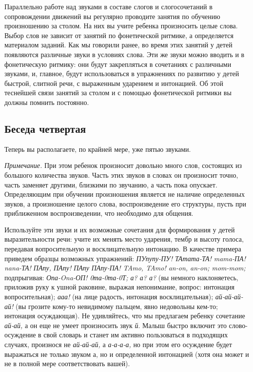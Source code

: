\documentclass[a5paper]{book}
\renewcommand{\emph}[1]{\textit{#1}}
\begin{document}
Параллельно работе над звуками в составе слогов и слогосочетаний в
сопровождении движений вы регулярно проводите занятия по обучению
произношению за столом. На них вы учите ребенка произносить целые слова.
Выбор слов не зависит от занятий по фонетической ритмике, а определяется
материалом заданий. Как мы говорили ранее, во время этих занятий у детей
появляются различные звуки в условиях слова. Эти же звуки можно вводить
и в фонетическую ритмику: они будут закрепляться в сочетаниях с
различными звуками, и, главное, будут использоваться в упражнениях по
развитию у детей быстрой, слитной речи, с выраженным ударением и
интонацией. Об этой теснейшей связи занятий за столом и с помощью
фонетической ритмики вы должны помнить постоянно.

\subsection*{Беседа четвертая}

Теперь вы располагаете, по крайней мере, уже пятью звуками.

\emph{Примечание.} При этом ребенок произносит довольно много слов,
состоящих из большого количества звуков. Часть этих звуков в словах он
произносит точно, часть заменяет другими, близкими по звучанию, а часть
пока опускает. Определяющим при обучении произношения является не
наличие определенных звуков, а произношение целого слова,
воспроизведение его структуры, пусть при приближенном воспроизведении,
что необходимо для общения.

Используйте эти звуки и их возможные сочетания для формирования у детей
выразительности речи: учите их менять место ударения, тембр и высоту
голоса, передавая вопросительную и восклицательную интонацию. В качестве
примера приведем образцы возможных упражнений: \emph{ПУпупу-ПУ!
ТАтата-ТА! mama-ПА! nana-ТА! ПАпу, ПАпу! ПАпу} \emph{ПАпу-ПА! TAmo,
TAmo! an-on, an-on; mom-mom;} подпрыгивая: \emph{Опа-Ona-ОП! 0та-0та-0Т;
а? а? а?} (вы немного наклоняетесь, приложив руку к ушной раковине,
выражая непонимание, вопрос: интонация вопросительная); \emph{ааа!} (на
лице радость, интонация восклицательная); \emph{ай-ай-ай-ай!} (вы
грозите кому-то невидимому пальцем, явно недовольны кем-то; интонация
осуждающая). Не удивляйтесь, что мы предлагаем ребенку сочетание
\emph{ай-ай,} а он еще не умеет произносить звук \emph{й}. Малыш быстро
включит это слово-осуждение в свой словарь и станет им активно
пользоваться в подходящих случаях, произнося не \emph{ай-ай-ай,} а
\emph{а-а-а-а,} но при этом его осуждение будет выражаться не только
звуком а, но и определенной интонацией (хотя она может и не в полной
мере соответствовать вашей).
\end{document}
